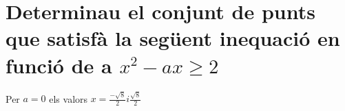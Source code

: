 \section{Determinau el conjunt de punts que satisfà la següent inequació en funció de a \texorpdfstring{$x^2-ax \geq 2$}{x^2-ax }}
Per $a = 0$ els valors $x= \frac{- \sqrt{8}}{2} i \frac{ \sqrt{8}}{2}$
